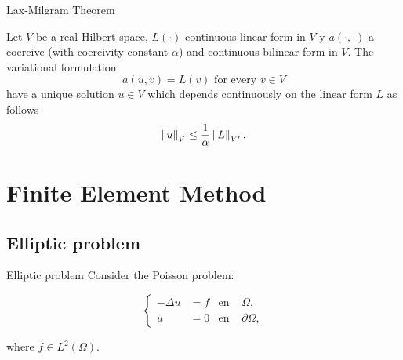 \begin{frame}{Lax-Milgram Theorem}

\begin{theorem}
	\label{theorem:Lax_Milgram}
	Let $V$ be a real Hilbert space, $L(\cdot)$ continuous linear form in $V$ y $a(\cdot,\cdot)$ a coercive (with coercivity constant $\alpha$) and continuous bilinear form in $V$. The variational formulation $$a(u,v)=L(v)\text{ for every }v\in V$$ have a unique solution $u\in V$ which depends continuously on the linear form $L$ as follows
	$$\left\|u\right\|_V\le \frac{1}{\alpha}\left\|L\right\|_{V'}.$$
\end{theorem}

\end{frame}

\section{Finite Element Method}

\subsection{Elliptic problem}

\begin{frame}{Elliptic problem}
Consider the Poisson problem:
\begin{block}{}
\begin{equation*}
\left\{
\begin{aligned}
-\Delta u&=f & \text{en } &\Omega, \\
u&=0 & \text{en } &\partial\Omega,
\end{aligned}
\right.
\end{equation*}
\end{block}
where $f\in L^2\left(\Omega\right)$.
\end{frame}


